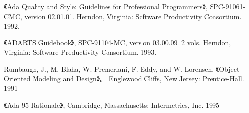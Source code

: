 \begin{thebibliography}{widest-label}
 《Ada Quality and Style: Guidelines
for Professional Programmers》, SPC-91061-CMC, version 02.01.01.
Herndon, Virginia: Software Productivity Consortium. 1992.

 《ADARTS Guidebook》, SPC-91104-MC,
version 03.00.09. 2 vols. Herndon, Virginia: Software Productivity Consortium.
1993.

 Rumbaugh, J., M. Blaha, W. Premerlani, F. Eddy, and W. Lorensen, 《Object-Oriented Modeling and Design》。
Englewood Cliffs, New Jersey: Prentice-Hall. 1991

 《Ada 95 Rationale》, Cambridge,
Massachusetts: Intermetrics, Inc. 1995

\end{thebibliography}
